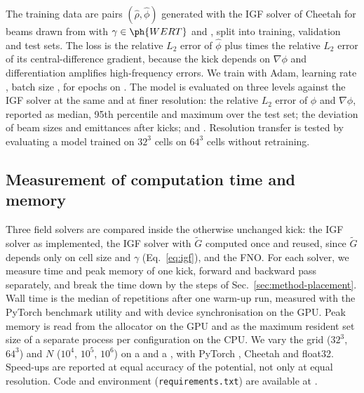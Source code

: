 The training data are pairs $(\hat\rho,\hat\phi)$ generated with the IGF
solver of Cheetah for  beams drawn from  with $\gamma\in\ph{WERT}$ and
, split  into training,
validation and test sets. The loss is the relative $L_2$ error of
$\hat\phi$ plus  times the relative $L_2$ error of its
central-difference gradient, because the kick depends on $\nabla\phi$ and
differentiation amplifies high-frequency errors. We train with Adam,
learning rate , batch size , for  epochs on
.
The model is evaluated on three levels against the IGF solver at the same
and at finer resolution: the relative $L_2$ error of $\phi$ and
$\nabla\phi$, reported as median, 95th percentile and maximum over the
test set; the deviation of beam sizes and emittances after 
kicks; and . Resolution transfer is tested by evaluating a
model trained on $32^3$ cells on $64^3$ cells without retraining.

\subsection{Measurement of computation time and memory}
\label{sec:method-measurement}
Three field solvers are compared inside the otherwise unchanged kick:
the IGF solver as implemented, the IGF solver with $\tilde G$ computed once
and reused, since $\tilde G$ depends only on cell size and $\gamma$
(Eq.~\eqref{eq:igf}), and the FNO. For each solver, we measure time and
peak memory of one kick, forward and backward pass separately, and break
the time down by the steps of Sec.~\ref{sec:method-placement}. Wall time
is the median of  repetitions after one warm-up run, measured
with the PyTorch benchmark utility and with device synchronisation on the
GPU. Peak memory is read from the allocator on the GPU and as the maximum
resident set size of a separate process per configuration on the CPU. We
vary the grid ($32^3$, $64^3$) and $N$ ($10^4$, $10^5$, $10^6$) on a
 and a , with PyTorch , Cheetah
 and float32. Speed-ups are reported at equal accuracy of the
potential, not only at equal resolution. Code and environment
(\texttt{requirements.txt}) are available at .


